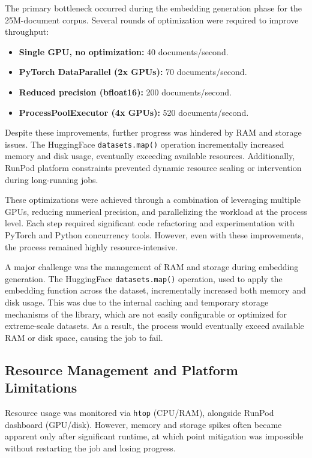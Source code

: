\documentclass[12pt]{article}
\begin{document}
The primary bottleneck occurred during the embedding generation phase for the 25M-document corpus. Several rounds of optimization were required to improve throughput:
\begin{itemize}
    \item \textbf{Single GPU, no optimization:} 40 documents/second.
    \item \textbf{PyTorch DataParallel (2x GPUs):} 70 documents/second.
    \item \textbf{Reduced precision (bfloat16):} 200 documents/second.
    \item \textbf{ProcessPoolExecutor (4x GPUs):} 520 documents/second.
\end{itemize}
Despite these improvements, further progress was hindered by RAM and storage issues. The HuggingFace \texttt{datasets.map()} operation incrementally increased memory and disk usage, eventually exceeding available resources. Additionally, RunPod platform constraints prevented dynamic resource scaling or intervention during long-running jobs.

These optimizations were achieved through a combination of leveraging multiple GPUs, reducing numerical precision, and parallelizing the workload at the process level. Each step required significant code refactoring and experimentation with PyTorch and Python concurrency tools. However, even with these improvements, the process remained highly resource-intensive.

A major challenge was the management of RAM and storage during embedding generation. The HuggingFace \texttt{datasets.map()} operation, used to apply the embedding function across the dataset, incrementally increased both memory and disk usage. This was due to the internal caching and temporary storage mechanisms of the library, which are not easily configurable or optimized for extreme-scale datasets. As a result, the process would eventually exceed available RAM or disk space, causing the job to fail.

\subsection{Resource Management and Platform Limitations}

Resource usage was monitored via \texttt{htop} (CPU/RAM), alongside RunPod dashboard (GPU/disk). However, memory and storage spikes often became apparent only after significant runtime, at which point mitigation was impossible without restarting the job and losing progress. 
\end{document}
